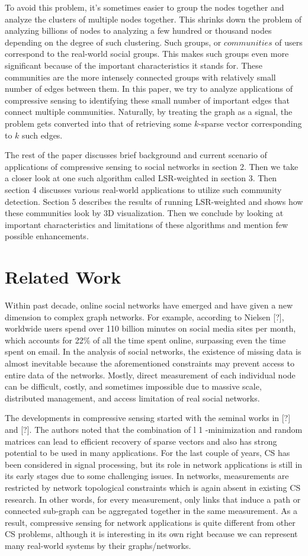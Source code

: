 \documentclass{article}
\begin{document}
To avoid this problem, it's sometimes easier to group the nodes together and analyze the clusters of multiple nodes
together. This shrinks down the problem of analyzing billions of nodes to analyzing a few hundred or thousand nodes
depending on the degree of such clustering. Such groups, or $communities$ of users correspond to the real-world social
groups. This makes such groups even more significant because of the important characteristics it stands for. These
communities are the more intensely connected groups with relatively small number of edges between them. In this paper,
we try to analyze applications of compressive sensing to identifying these small number of important edges that connect
multiple communities. Naturally, by treating the graph as a signal, the problem gets converted into that of retrieving
some $k$-sparse vector corresponding to $k$ such edges. 

The rest of the paper discusses brief background and current scenario of applications of compressive sensing to social
networks in section 2. Then we take a closer look at one such algorithm called LSR-weighted in section 3. Then section 4
discusses various real-world applications to utilize such community detection. Section 5 describes the results of
running LSR-weighted and shows how these communities look by 3D visualization. Then we conclude by looking at important
characteristics and limitations of these algorithms and mention few possible enhancements. 
\section{Related Work}
Within past decade, online social networks have emerged and have given a new dimension to complex graph networks. For
example, according to Nielsen [?], worldwide users spend over 110 billion minutes on social media sites per month, which
accounts for 22\% of all the time spent online, surpassing even the time spent on email. In the analysis of social networks, the existence of missing data is almost inevitable because the aforementioned constraints may prevent access to entire data of the networks. Mostly, direct measurement of each individual node can be difficult, costly, and sometimes impossible due to massive scale, distributed management, and access limitation of real social networks.

The developments in compressive sensing started with the seminal works in [?] and [?]. The authors noted that the
combination of l 1 -minimization and random matrices can lead to efficient recovery of sparse vectors and also has
strong potential to be used in many applications. For the last couple of years, CS has been considered in signal
processing, but its role in network applications is still in its early stages due to some challenging issues. In networks, measurements are restricted by network topological constraints which is again absent in existing CS research. In other words, for every measurement, only links that induce a path or connected sub-graph can be aggregated together in the same measurement. As a result, compressive sensing for network applications is quite different from other CS problems, although it is interesting in its own right because we can represent many real-world systems by their graphs/networks.
\end{document}
